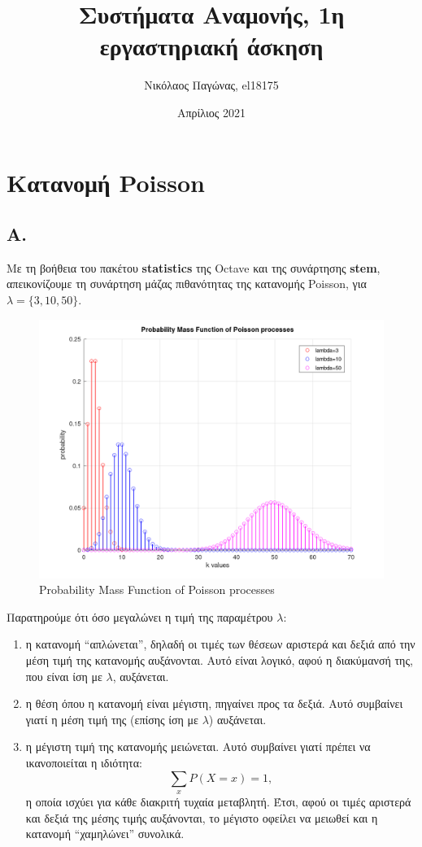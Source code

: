 \documentclass[a4paper]{article}
\title{Συστήματα Αναμονής, 1η εργαστηριακή άσκηση}
\author{Νικόλαος Παγώνας, el18175}
\date{Απρίλιος 2021}
\begin{document}
\maketitle

\section*{Κατανομή Poisson} 

\subsection*{Α.}

Με τη βοήθεια του πακέτου \textbf{statistics} της Octave και της συνάρτησης \textbf{stem}, απεικονίζουμε τη συνάρτηση μάζας πιθανότητας της κατανομής Poisson, για $ {λ = \{3,10,50\}} $.

\begin{figure}[H]
	\includegraphics[width=\textwidth]{../images/Poisson_Distribution_A.png}
	\caption{Probability Mass Function of Poisson processes}
	\label{fig:Poisson Distribution A}
\end{figure}


Παρατηρούμε ότι όσο μεγαλώνει η τιμή της παραμέτρου $ λ $:
\begin{enumerate}	
	\item η κατανομή ``απλώνεται'', δηλαδή οι τιμές των θέσεων αριστερά και δεξιά από την μέση τιμή της κατανομής αυξάνονται. Αυτό είναι λογικό, αφού η διακύμανσή της, που είναι ίση με $ λ $, αυξάνεται. 
	\item η θέση όπου η κατανομή είναι μέγιστη, πηγαίνει προς τα δεξιά. Αυτό συμβαίνει γιατί η μέση τιμή της (επίσης ίση με $ λ $) αυξάνεται.
	\item η μέγιστη τιμή της κατανομής μειώνεται. Αυτό συμβαίνει γιατί πρέπει να ικανοποιείται η ιδιότητα:
	\[
		\sum_{x} P(X = x) = 1,
	\]
	η οποία ισχύει για κάθε διακριτή τυχαία μεταβλητή. Έτσι, αφού οι τιμές αριστερά και δεξιά της μέσης τιμής αυξάνονται, το μέγιστο οφείλει να μειωθεί και η κατανομή ``χαμηλώνει'' συνολικά. 
\end{enumerate}
\end{document}
